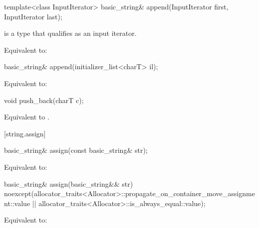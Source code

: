 %
\begin{itemdecl}
template<class InputIterator>
  basic_string& append(InputIterator first, InputIterator last);
\end{itemdecl}

\begin{itemdescr}
\pnum
\constraints
{} is a type that qualifies as an input
iterator.

\pnum
\effects Equivalent to: 
\end{itemdescr}

%
\begin{itemdecl}
basic_string& append(initializer_list<charT> il);
\end{itemdecl}

\begin{itemdescr}
\pnum
\effects Equivalent to: 
\end{itemdescr}

%
\begin{itemdecl}
void push_back(charT c);
\end{itemdecl}

\begin{itemdescr}
\pnum
\effects
Equivalent to
.
\end{itemdescr}

[string.assign]{}

%
\begin{itemdecl}
basic_string& assign(const basic_string& str);
\end{itemdecl}

\begin{itemdescr}
\pnum
\effects Equivalent to: 
\end{itemdescr}

%
\begin{itemdecl}
basic_string& assign(basic_string&& str)
  noexcept(allocator_traits<Allocator>::propagate_on_container_move_assignment::value ||
           allocator_traits<Allocator>::is_always_equal::value);
\end{itemdecl}

\begin{itemdescr}
\pnum
\effects Equivalent to: 
\end{itemdescr}



